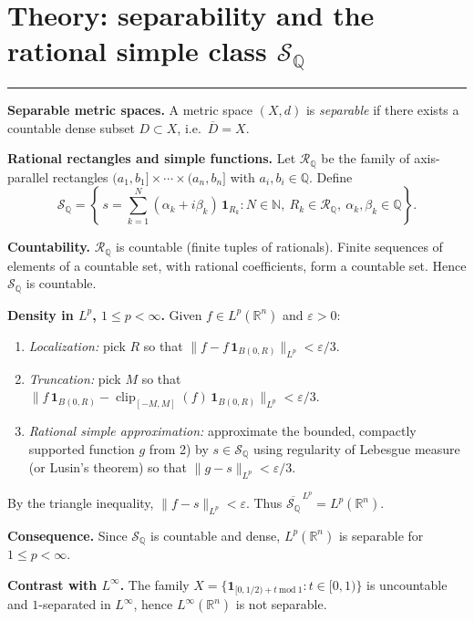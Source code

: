 \documentclass[12pt,a4paper]{article}
\theoremstyle{plain}
\theoremstyle{definition}
\theoremstyle{remark}
\theoremstyle{remark}
\newcommand{\tighthrule}{\vspace{0.6\baselineskip}\hrule\vspace{0.8\baselineskip}}
\newenvironment{spacy}{\begingroup\setlength{\parskip}{6pt}\setlength{\parindent}{0pt}}{\endgroup}
\theoremstyle{definition}
\begin{document}
\section*{Theory: separability and the rational simple class $\mathcal S_{\mathbb Q}$}

\tighthrule
\begin{spacy}
	\textbf{Separable metric spaces.}
	A metric space $(X,d)$ is \emph{separable} if there exists a countable dense subset $D\subset X$,
	i.e.\ $\overline D=X$.
	
	\textbf{Rational rectangles and simple functions.}
	Let $\mathcal R_{\mathbb Q}$ be the family of axis-parallel rectangles
	$(a_1,b_1]\times\cdots\times(a_n,b_n]$ with $a_i,b_i\in\mathbb Q$.
	Define
	\[
	\mathcal S_{\mathbb Q}
	= \left\{\, s=\sum_{k=1}^N (\alpha_k+i\beta_k)\,\mathbf 1_{R_k}
	: N\in\mathbb N,\ R_k\in\mathcal R_{\mathbb Q},\ \alpha_k,\beta_k\in\mathbb Q \right\}.
	\]
	
	\textbf{Countability.}
	$\mathcal R_{\mathbb Q}$ is countable (finite tuples of rationals).
	Finite sequences of elements of a countable set, with rational coefficients, form a countable set.
	Hence $\mathcal S_{\mathbb Q}$ is countable.
	
	\textbf{Density in $L^p$, $1\le p<\infty$.}
	Given $f\in L^p(\mathbb R^n)$ and $\varepsilon>0$:
	\begin{enumerate}[label=\arabic*)]
		\item \emph{Localization:} pick $R$ so that $\|f-f\,\mathbf 1_{B(0,R)}\|_{L^p}<\varepsilon/3$.
		\item \emph{Truncation:} pick $M$ so that
		$\|f\,\mathbf 1_{B(0,R)}-\operatorname{clip}_{[-M,M]}(f)\,\mathbf 1_{B(0,R)}\|_{L^p}<\varepsilon/3$.
		\item \emph{Rational simple approximation:}
		approximate the bounded, compactly supported function $g$ from 2) by
		$s\in\mathcal S_{\mathbb Q}$ using regularity of Lebesgue measure (or Lusin’s theorem) so that
		$\|g-s\|_{L^p}<\varepsilon/3$.
	\end{enumerate}
	By the triangle inequality, $\|f-s\|_{L^p}<\varepsilon$.
	Thus $\overline{\mathcal S_{\mathbb Q}}^{\,L^p}=L^p(\mathbb R^n)$.
	
	\textbf{Consequence.}
	Since $\mathcal S_{\mathbb Q}$ is countable and dense, $L^p(\mathbb R^n)$ is separable for $1\le p<\infty$.
	
	\textbf{Contrast with $L^\infty$.}
	The family $X=\{\mathbf 1_{[0,1/2)+t \ \mathrm{mod}\ 1}: t\in[0,1)\}$ is uncountable and
	$1$-separated in $L^\infty$, hence $L^\infty(\mathbb R^n)$ is not separable.
\end{spacy}
\end{document}

